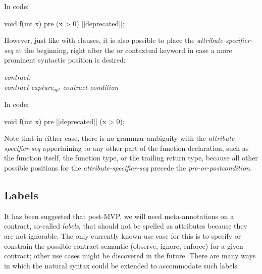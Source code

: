 In code:

\begin{codeblock}
void f(int x)
  pre (x > 0) [[deprecated]];
\end{codeblock}

However, just like with  clauses, it is also possible to place the \emph{attribute-specifier-seq} at the beginning, right after the  or  contextual keyword in case a more prominent syntactic position is desired:

\begin{adjustwidth}{0.5cm}{0.5cm}

\emph{contract:} \\
\phantom{~~~} \emph{contract-capture}$_{opt}$ \emph{contract-condition} 

\end{adjustwidth}

In code:

\begin{codeblock}
void f(int x)
  pre [[deprecated]] (x > 0);
\end{codeblock}

Note that in either case, there is no grammar ambiguity with the \emph{attribute-specifier-seq} appertaining to any other part of the function declaration, such as the function itself, the function type, or the trailing return type, because all other possible positions for the \emph{attribute-specifier-seq} precede the \emph{pre-or-postcondition}.


\subsection{Labels}
\label{subsec:labels}

It has been suggested that post-MVP, we will need meta-annotations on a contract, so-called \emph{labels}, that should not be spelled as attributes because they are not ignorable. The only currently known use case for this is to specify or constrain the possible contract semantic (observe, ignore, enforce) for a given contract; other use cases might be discovered in the future. There are many ways in which the natural syntax could be extended to accommodate such labels.

